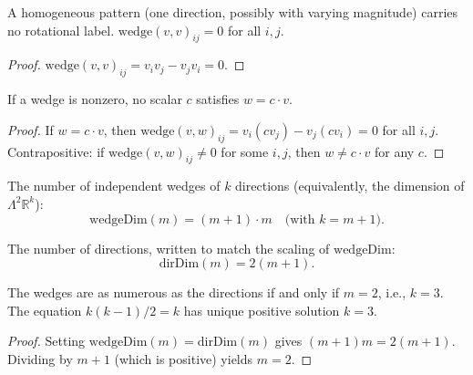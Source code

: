 \begin{theorem}
A homogeneous pattern (one direction, possibly with varying magnitude) carries no rotational label.
$\text{wedge}(v, v)_{ij} = 0$ for all $i, j$.
\end{theorem}
\begin{proof}
$\text{wedge}(v, v)_{ij} = v_i v_j - v_j v_i = 0$.
\end{proof}

\begin{theorem}
If a wedge is nonzero, no scalar $c$ satisfies $w = c \cdot v$.
\end{theorem}
\begin{proof}
If $w = c \cdot v$, then $\text{wedge}(v, w)_{ij} = v_i (cv_j) - v_j (cv_i) = 0$ for all $i, j$.
Contrapositive: if $\text{wedge}(v, w)_{ij} \neq 0$ for some $i, j$, then $w \neq c \cdot v$ for any $c$.
\end{proof}

\begin{definition}
The number of independent wedges of $k$ directions (equivalently, the dimension of $\Lambda^2 \mathbb{R}^k$):
\[\text{wedgeDim}(m) = (m+1) \cdot m \quad \text{(with $k = m+1$)}.\]
\end{definition}

\begin{definition}
The number of directions, written to match the scaling of $\text{wedgeDim}$:
\[\text{dirDim}(m) = 2(m+1).\]
\end{definition}

\begin{theorem}
The wedges are as numerous as the directions if and only if $m = 2$, i.e., $k = 3$.
The equation $k(k-1)/2 = k$ has unique positive solution $k = 3$.
\end{theorem}
\begin{proof}
Setting $\text{wedgeDim}(m) = \text{dirDim}(m)$ gives $(m+1)m = 2(m+1)$. Dividing by $m+1$ (which is positive) yields $m = 2$.
\end{proof}

